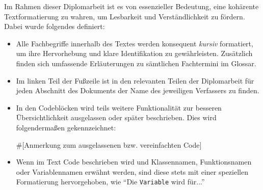 \noindent Im Rahmen dieser Diplomarbeit ist es von essenzieller Bedeutung, eine kohärente Textformatierung zu wahren, um Lesbarkeit und Verständlichkeit zu fördern. Dabei wurde folgendes definiert:
\begin{itemize}
    \item Alle Fachbegriffe innerhalb des Textes werden konsequent \textit{kursiv} formatiert, um ihre Hervorhebung und klare Identifikation zu gewährleisten. Zusätzlich finden sich umfassende Erläuterungen zu sämtlichen Fachtermini im Glossar.

    \item Im linken Teil der Fußzeile ist in den relevanten Teilen der Diplomarbeit für jeden Abschnitt des Dokuments der Name des jeweiligen Verfassers zu finden.  
    
    \item In den Codeblöcken wird teils weitere Funktionalität zur besseren Übersichtlichkeit ausgelassen oder später beschrieben. Dies wird folgendermaßen gekennzeichnet: \begin{pythoncode}
#[Anmerkung zum ausgelassenen bzw. vereinfachten Code]
    \end{pythoncode}

    \item Wenn im Text Code beschrieben wird und Klassennamen, Funktionsnamen oder Variablennamen erwähnt werden, sind diese stets mit einer speziellen Formatierung hervorgehoben, wie \zB \enquote{Die \lstinline{Variable} wird für...}
\end{itemize}




